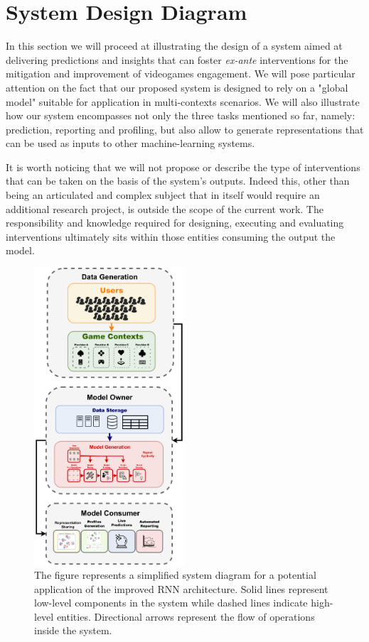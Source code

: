 \section{System Design Diagram}
\label{pipeline}

In this section we will proceed at illustrating the design of a system aimed at delivering predictions and insights that can foster \textit{ex-ante} interventions for the mitigation and improvement of videogames engagement. We will pose particular attention on the fact that our proposed system is designed to rely on a "global model" \cite{wang2019deep} suitable for application in multi-contexts scenarios. We will also illustrate how our system encompasses not only the three tasks mentioned so far, namely: prediction, reporting and profiling, but also allow to generate representations that can be used as inputs to other machine-learning systems. 

It is worth noticing that we will not propose or describe the type of interventions that can be taken on the basis of the system's outputs. Indeed this, other than being an articulated and complex subject that in itself would require an additional research project, is outside the scope of the current work. The responsibility and knowledge required for designing, executing and evaluating interventions ultimately sits within those entities consuming the output the model.

\begin{figure}[ht]
\centering
\includegraphics[width=0.5\textwidth]{images/chapter_5/pipeline_diagram.png}
\caption[\textbf{Model Deployment Pipeline}]{The figure represents a simplified system diagram for a potential application of the improved RNN architecture. Solid lines represent low-level components in the system while dashed lines indicate high-level entities. Directional arrows represent the flow of operations inside the system.}
\label{pipeline}
\end{figure}

